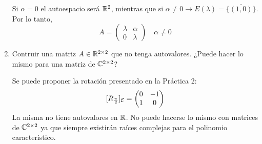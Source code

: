 \begin{enumerate}
\begin{mdframed}[style=s]
                Si $\alpha=0$ el autoespacio será $\mathbb{R}^2$, mientras que si $\alpha\neq0\to E(\lambda)=\overline{\{(1,0)\}}$. Por lo tanto,
                \[A=\begin{pmatrix}
                    \lambda&\alpha\\0&\lambda
                \end{pmatrix}\quad \alpha\neq0\]
            \end{mdframed}
        \item Contruir una matriz $A\in\mathbb{R}^{2\times2}$ que no tenga autovalores. ¿Puede hacer lo mismo para una matriz de $\mathbb{C}^{2\times2}$?
            \begin{mdframed}[style=s]
                Se puede proponer la rotación presentado en la Práctica 2:
                \[[R_\frac{\pi}{2}]_{\mathcal{E}}=\begin{pmatrix}
                    0&-1\\1&0
                \end{pmatrix}\]
                La misma no tiene autovalores en $\mathbb{R}$. No puede hacerse lo mismo con matrices de $\mathbb{C}^{2\times2}$ ya que siempre existirán raíces complejas para el polinomio característico.
            \end{mdframed}
    \end{enumerate}